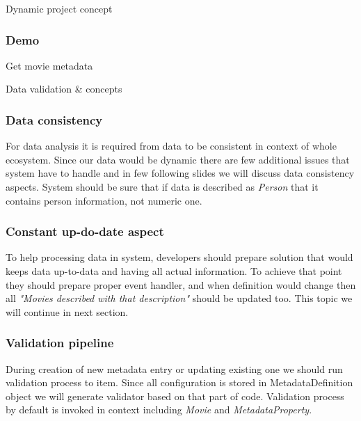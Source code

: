\documentclass{beamer}
\begin{document}
\begin{section}{Dynamic project concept}
\begin{frame}
\frametitle{Demo}
Get movie metadata
\end{frame}

\end{section}

\begin{section}{Data validation \& concepts}

\begin{frame}
\frametitle{Data consistency}
For data analysis it is required from data to be consistent in context of whole ecosystem. Since our data would be dynamic there are few additional issues that system have to handle and in few following slides we will discuss data consistency aspects. \newline \newline
System should be sure that if data is described as \textit{Person} that it contains person information, not numeric one.
\end{frame}

\begin{frame}
\frametitle{Constant up-do-date aspect}
To help processing data in system, developers should prepare solution that would keeps data up-to-data and having all actual information. To achieve that point they should prepare proper event handler, and when definition would change then all \textit{"Movies described with that description"} should be updated too. \newline
\newline
This topic we will continue in next section.

\end{frame}

\begin{frame}
\frametitle{Validation pipeline}
During creation of new metadata entry or updating existing one we should run validation process to  item. Since all configuration is stored in MetadataDefinition object we will generate validator based on that part of code. Validation process by default is invoked in context including \textit{Movie} and \textit{MetadataProperty}.
\end{frame}


\end{section}
\end{document}
